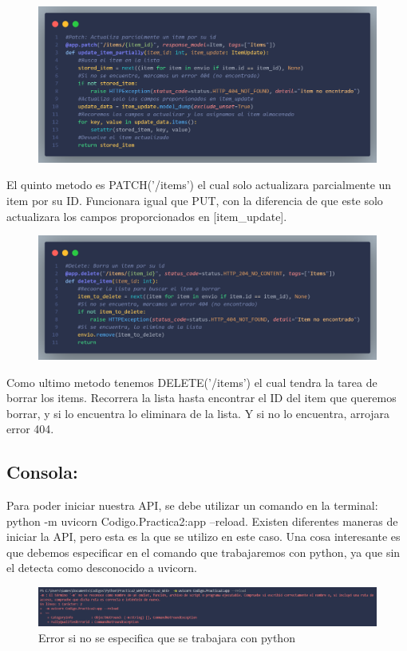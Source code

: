 \documentclass[12pt]{article}
\begin{document}
\begin{figure}[H]
    \centering
    \includegraphics[width=1\textwidth]{Imagenes/Captura9_patch.png}
\end{figure}
El quinto metodo es PATCH('/items') el cual solo actualizara parcialmente un item por su ID.
Funcionara igual que PUT, con la diferencia de que este solo actualizara los campos proporcionados en [item\_update].

\begin{figure}[H]
    \centering
    \includegraphics[width=1\textwidth]{Imagenes/Captura10_patch.png}    
\end{figure}
Como ultimo metodo tenemos DELETE('/items') el cual tendra la tarea de borrar los items.
Recorrera la lista hasta encontrar el ID del item que queremos borrar, y si lo encuentra lo eliminara de la lista.
Y si no lo encuentra, arrojara error 404.

\vspace{1cm}

\subsection*{Consola:}
Para poder iniciar nuestra API, se debe utilizar un comando en la terminal: python -m uvicorn Codigo.Practica2:app --reload.
Existen diferentes maneras de iniciar la API, pero esta es la que se utilizo en este caso.
Una cosa interesante es que debemos especificar en el comando que trabajaremos con python, ya que sin el detecta como desconocido a uvicorn.
\begin{figure}[H]
    \centering
    \includegraphics[width=1\textwidth]{Imagenes/Captura_consola2.png}
    \caption{Error si no se especifica que se trabajara con python}
\end{figure}
\end{document}
